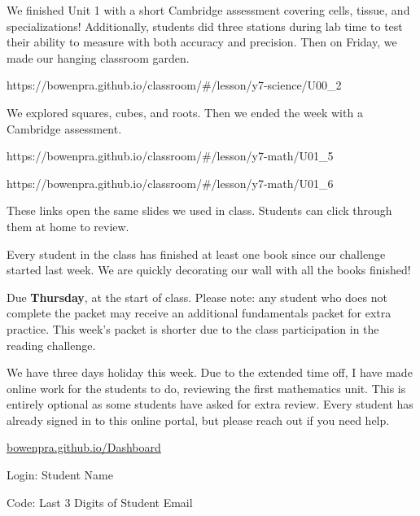 \documentclass[11pt]{article}
\begin{document}
\begin{annbody}


We finished Unit 1 with a short Cambridge assessment covering cells, tissue,
and specializations! Additionally, students did three stations during lab
time to test their ability to measure with both accuracy and precision. Then
on Friday, we made our hanging classroom garden.\par
\vspace{3pt}%
  {https://bowenpra.github.io/classroom/\#/lesson/y7-science/U00\_2}

We explored squares, cubes, and roots. Then we ended the week with a Cambridge
assessment.\par
\vspace{3pt}%
  {https://bowenpra.github.io/classroom/\#/lesson/y7-math/U01\_5}\par
\vspace{3pt}%
  {https://bowenpra.github.io/classroom/\#/lesson/y7-math/U01\_6}

\vspace{5pt}
These links open the same slides we used in class. Students can click through
them at home to review.


Every student in the class has finished at least one book since our challenge
started last week. We are quickly decorating our wall with all the books
finished!


Due \textbf{Thursday}, at the start of class. Please note: any student who
does not complete the packet may receive an additional fundamentals packet
for extra practice. This week's packet is shorter due to the class
participation in the reading challenge.
\par\vspace{4pt}


We have three days holiday this week. Due to the extended time off, I have
made online work for the students to do, reviewing the first mathematics
unit. This is entirely optional as some students have asked for extra
review. Every student has already signed in to this online portal, but
please reach out if you need help.
\par\vspace{4pt}
\href{https://bowenpra.github.io/Dashboard/}{bowenpra.github.io/Dashboard}
\par\vspace{4pt}
Login: Student Name\par
Code: Last 3 Digits of Student Email


\end{annbody}
\end{document}
